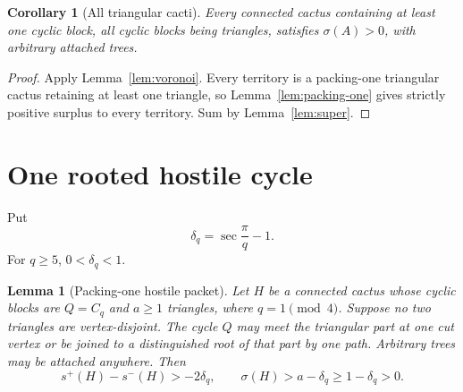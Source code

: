 \documentclass[11pt]{article}
\newtheorem{lemma}[theorem]{Lemma}
\newtheorem{corollary}[theorem]{Corollary}
\theoremstyle{remark}
\newcommand{\splus}{s^+}
\newcommand{\sminus}{s^-}
\newcommand{\sig}{\sigma}
\begin{document}
\begin{corollary}[All triangular cacti]\label{cor:triangular}
Every connected cactus containing at least one cyclic block, all cyclic blocks
being triangles, satisfies $\sig(A)>0$, with arbitrary attached trees.
\end{corollary}

\begin{proof}
Apply Lemma~\ref{lem:voronoi}.  Every territory is a packing-one triangular
cactus retaining at least one triangle, so Lemma~\ref{lem:packing-one} gives
strictly positive surplus to every territory.  Sum by
Lemma~\ref{lem:super}.
\end{proof}

\section{One rooted hostile cycle}

Put
\[
 \delta_q=\sec\frac{\pi}{q}-1.
\]
For $q\geq5$, $0<\delta_q<1$.

\begin{lemma}[Packing-one hostile packet]\label{lem:hostile-packet}
Let $H$ be a connected cactus whose cyclic blocks are $Q=C_q$ and $a\geq1$
triangles, where $q=1\pmod4$.  Suppose no two triangles are vertex-disjoint.
The cycle $Q$ may meet the triangular part at one cut vertex or be joined to a
distinguished root of that part by one path.  Arbitrary trees may be attached
anywhere.  Then
\[
 \splus(H)-\sminus(H)>-2\delta_q,
 \qquad
 \sig(H)>a-\delta_q\geq1-\delta_q>0.
\]
\end{lemma}
\end{document}
